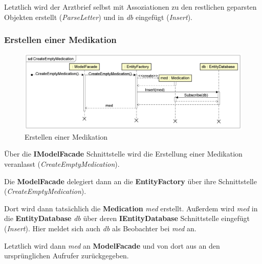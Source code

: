 \documentclass[a4paper]{scrreprt}
\begin{document}
Letztlich wird der Arztbrief selbst mit Assoziationen zu den restlichen geparsten Objekten erstellt (\textit{ParseLetter}) und in \textit{db} eingefügt (\textit{Insert}).


\subsubsection{Erstellen einer Medikation}
\begin{figure}[H]
\centering
\includegraphics[width=0.75\textheight]{graphics/Klassendiagramme/Model/CreateEmptyMedication.png}
\caption{Erstellen einer Medikation}
\end{figure}
Über die \textbf{IModelFacade} Schnittstelle wird die Erstellung einer Medikation veranlasst (\textit{CreateEmptyMedication}). 

Die \textbf{ModelFacade} delegiert dann an die \textbf{EntityFactory} über ihre Schnittstelle (\textit{CreateEmptyMedication}).

Dort wird dann tatsächlich die \textbf{Medication} \textit{med} erstellt. Außerdem wird 
\textit{med} in die \textbf{EntityDatabase} \textit{db} über deren \textbf{IEntityDatabase} Schnittstelle eingefügt (\textit{Insert}). Hier meldet sich auch \textit{db} als Beobachter bei \textit{med} an.

Letztlich wird dann \textit{med} an \textbf{ModelFacade} und von dort aus an den ursprünglichen Aufrufer zurückgegeben.
\end{document}
